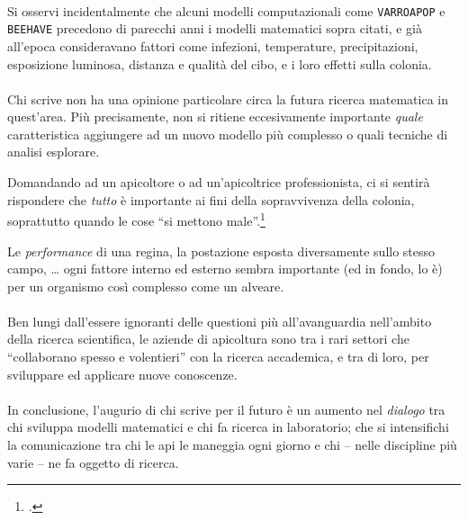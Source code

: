 \paragraph{}
Si osservi incidentalmente che alcuni modelli computazionali come \texttt{VARROAPOP} e \texttt{BEEHAVE} precedono
di parecchi anni i modelli matematici sopra citati, e già all'epoca consideravano fattori come infezioni,
temperature, precipitazioni, esposizione luminosa, distanza e qualità del cibo, e i loro effetti sulla colonia.

\paragraph{}
Chi scrive non ha una opinione particolare circa la futura ricerca matematica in quest'area.
Più precisamente, non si ritiene eccesivamente importante \emph{quale} caratteristica aggiungere ad un nuovo
modello più complesso o quali tecniche di analisi esplorare.

Domandando ad un apicoltore o ad un'apicoltrice professionista, ci si sentirà rispondere che \emph{tutto} è
importante ai fini della sopravvivenza della colonia, soprattutto quando
le cose ``si mettono male''.\footcite{privFDL,privFPan}

Le \emph{performance} di una regina, la postazione esposta diversamente sullo stesso campo, \dots
ogni fattore interno ed esterno sembra importante (ed in fondo, lo è) per un organismo così complesso come un alveare.

\paragraph{}
Ben lungi dall'essere ignoranti delle questioni più all'avanguardia nell'ambito della ricerca scientifica,
le aziende di apicoltura sono tra i rari settori che ``collaborano spesso e volentieri'' con la ricerca accademica,
e tra di loro, per sviluppare ed applicare nuove conoscenze.

\paragraph{}
In conclusione, l'augurio di chi scrive per il futuro è un aumento nel \emph{dialogo} tra chi sviluppa modelli matematici
e chi fa ricerca in laboratorio; che si intensifichi la comunicazione tra chi le api le maneggia ogni giorno e chi
-- nelle discipline più varie -- ne fa oggetto di ricerca.



